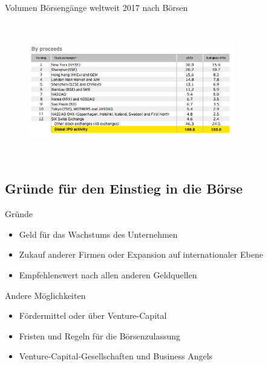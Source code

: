 \documentclass{beamer}
\begin{document}
\begin{frame} {Volumen Börsengänge weltweit 2017 nach Börsen}
\begin{figure}
	\centering
	\includegraphics[width=9cm, height=6cm]{IPOsExchangeProceeds.PNG}
\end{figure}
\end{frame}







\subsection{Gründe für den Einstieg in die Börse}
\begin{frame} {Gründe}
\begin{itemize}
\item Geld für das Wachstums des Unternehmen 
\item Zukauf anderer Firmen oder Expansion auf internationaler Ebene   
\item Empfehlenswert nach allen anderen Geldquellen  
\end{itemize}
\end{frame}
\begin{frame} {Andere Möglichkeiten}
\begin{itemize}
\item Fördermittel oder über Venture-Capital 
\item Fristen und Regeln für die Börsenzulassung
\item Venture-Capital-Gesellschaften und Business Angels
\end{itemize}
\end{frame}
\end{document}
